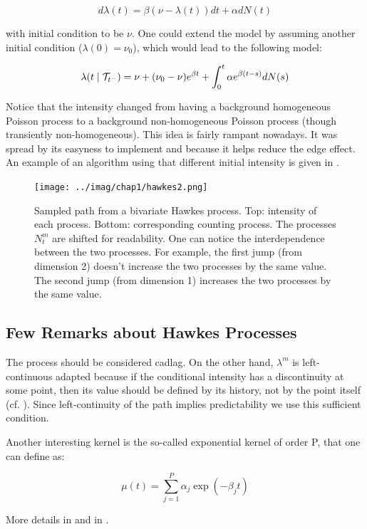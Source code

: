 \documentclass[11pt]{book}
\begin{document}
$$ d \lambda (t) = \beta ( \nu - \lambda (t) ) dt + \alpha d N(t) $$

with initial condition to be $\nu$. One could extend the model by assuming another initial condition ($\lambda( 0 ) = \nu_0$), which would lead to the following model:

$$ \lambda(t \mid  \mathcal{T}_{t^-} ) = \nu +  ( \nu_0 - \nu )  e^{\beta t } +  \int_0^t \alpha e^{\beta ( t -s ) } d N(s) $$

Notice that the intensity changed from having a background homogeneous Poisson process to a background non-homogeneous Poisson process (though transiently non-homogeneous). This idea is fairly rampant nowadays. It was spread by its easyness to implement and because it helps reduce the edge effect. An example of an algorithm using that different initial intensity is given in \cite{simuldassios}.
\label{section:dassios}




\begin{figure}
\centering
\texttt{[image: ../imag/chap1/hawkes2.png]}
\caption{Sampled path from a bivariate Hawkes process. Top: intensity of each process. Bottom: corresponding counting process. The processes $N_t^m$ are shifted for readability. One can notice the interdependence between the two processes. For example, the first jump (from dimension 2) doesn't increase the two processes by the same value. The second jump (from dimension 1) increases the two processes by the same value.}
\label{fig:hawkes2}
\end{figure}


\subsection{Few Remarks about Hawkes Processes}
\begin{remarque}
The process should be considered cadlag. On the other hand, $\lambda^m$ is left-continuous adapted because if the conditional intensity has a discontinuity at some point, then its value should be defined by its history, not by the point itself (cf. \cite{daley}). Since left-continuity of the path implies predictability we use this sufficient condition. 
\end{remarque}

\begin{remarque}
Another interesting kernel is the so-called exponential kernel of order P, that one can define as:

$$ \mu (t) = \sum_{j=1}^P \alpha_j \exp( - \beta_j t ) $$

More details in \cite{exphawkes} and in \cite{exphawkes2}.
\end{remarque}
\end{document}
